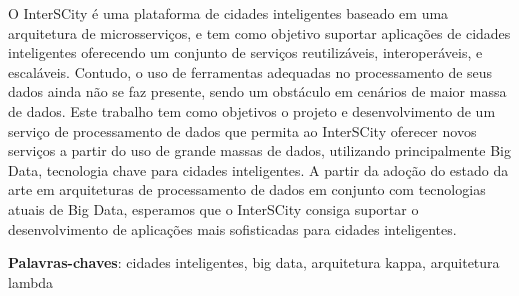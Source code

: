 \begin{resumo}

    O InterSCity é uma plataforma de cidades inteligentes baseado em uma
    arquitetura de microsserviços, e tem como objetivo suportar aplicações de %
    cidades inteligentes oferecendo um conjunto de serviços reutilizáveis,
    interoperáveis, e escaláveis. Contudo, o uso de ferramentas adequadas no
    processamento de seus dados ainda não se faz presente, sendo um obstáculo
    em cenários de maior massa de dados. Este trabalho tem como objetivos o
    projeto e desenvolvimento de um serviço de processamento de dados que
    permita ao InterSCity oferecer novos serviços a partir do uso de grande
    massas de dados, utilizando principalmente Big Data, tecnologia chave para
    cidades inteligentes. A partir da adoção do estado da arte em arquiteturas
    de processamento de dados em conjunto com tecnologias atuais de Big Data,
    esperamos que o InterSCity consiga suportar o desenvolvimento de aplicações
    mais sofisticadas para cidades inteligentes.

 \vspace{\onelineskip}
 \noindent
 \textbf{Palavras-chaves}: cidades inteligentes, big data, arquitetura kappa, arquitetura lambda
\end{resumo}

